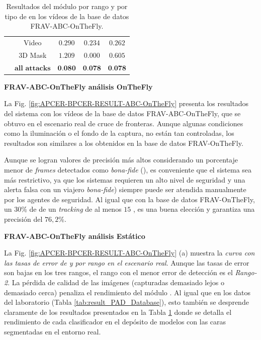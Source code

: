\begin{table}[t!]
\begin{tabular}{|c|c|c|c|c|}
                                  &Video& $0.290$ & $0.234$ & $0.262$ \\ \cline{2-5} 
                                  &$3$D Mask & $1.209$ & $0.000$ & $0.605$ \\ \cline{2-5}
                                  &$\textbf{all attacks}$ & $\textbf{0.080}$ & $\textbf{0.078}$ & $\textbf{0.078}$ \\ \hline
\end{tabular}
\caption{Resultados del módulo  por rango y por tipo de  en los vídeos de la base de datos \Gls{FRAV-ABC-OnTheFly}.}
\label{tab:result_PAD_Real}
\end{table}

\medskip
\textbf{\Gls{FRAV-ABC-OnTheFly} análisis \gls{OnTheFly}} %
\medskip

La Fig. \ref{fig:APCER-BPCER-RESULT-ABC-OnTheFly} presenta los resultados del sistema con los vídeos de la base de datos \Gls{FRAV-ABC-OnTheFly}, que se obtuvo en el escenario real de cruce de fronteras. Aunque algunas condiciones como la iluminación o el fondo de la captura, no están tan controladas, los resultados son similares a los obtenidos en la base de datos \Gls{FRAV-OnTheFly}.

Aunque se logran valores de precisión más altos considerando un porcentaje menor de \textit{frames} detectados como \textit{\gls{bona-fide}} (), es conveniente que el sistema sea más restrictivo, ya que los sistemas  requieren un alto nivel de seguridad y una alerta falsa con un viajero \textit{\gls{bona-fide}}) siempre puede ser atendida manualmente por los agentes de seguridad. Al igual que con la base de datos \Gls{FRAV-OnTheFly}, un $30$\% de  de un \textit{tracking} de al menos $15$ , es una buena elección y garantiza una precisión del $76,2$\%. 

\medskip
\textbf{\Gls{FRAV-ABC-OnTheFly} análisis Estático} %
\medskip

La Fig. \ref{fig:APCER-BPCER-RESULT-ABC-OnTheFly} (a) muestra la \textit{curva  con las tasas de error de  y  por rango en el escenario real}. Aunque las tasas de error son bajas en los tres rangos, el rango con el menor error de detección es el \textit{Rango-2}. La pérdida de calidad de las imágenes (capturadas demasiado lejos o demasiado cerca) penaliza el rendimiento del módulo . Al igual que en los datos del laboratorio (Tabla \ref{tab:result_PAD_Database}), esto también se desprende claramente de los resultados presentados en la Tabla \ref{tab:result_PAD_Real} donde se detalla el rendimiento de cada clasificador en el depósito de modelos con las caras segmentadas en el entorno real. 
\medskip


